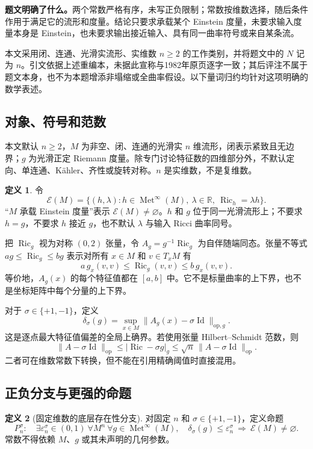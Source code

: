 \documentclass[11pt,a4paper]{article}
\theoremstyle{definition}
\newtheorem{definition}{定义}[section]
\newcommand{\Ric}{\operatorname{Ric}}
\newcommand{\id}{\operatorname{Id}}
\newcommand{\Met}{\operatorname{Met}}
\newcommand{\Ein}{\mathcal E}
\newcommand{\op}{\mathrm{op}}
\begin{document}
\textbf{题文明确了什么。}两个常数严格有序，未写正负限制；常数按维数选择，随后条件作用于满足它的流形和度量。结论只要求承载某个 Einstein 度量，未要求输入度量本身是 Einstein，也未要求输出接近输入、具有同一曲率符号或来自某条流。

本文采用闭、连通、光滑实流形、实维数 $n\ge2$ 的工作类别，并将题文中的 $N$ 记为 $n$。引文依据上述重编本，未据此宣称与1982年原页逐字一致；其后评注不属于题文本身，也不为本题增添非塌缩或全曲率假设。以下量词归约均针对这项明确的数学表述。

\subsection{对象、符号和范数}

本文默认 $n\ge2$，$M$ 为非空、闭、连通的光滑实 $n$ 维流形，闭表示紧致且无边界；$g$ 为光滑正定 Riemann 度量。除专门讨论特征数的四维部分外，不默认定向、单连通、Kähler、齐性或旋转对称。$n$ 是实维数，不是复维数。

\begin{definition}
令
\[
\Ein(M)=\{(h,\lambda):h\in\Met^\infty(M),\ \lambda\in\mathbb R,
\ \Ric_h=\lambda h\}.
\]
“$M$ 承载 Einstein 度量”表示 $\Ein(M)\ne\varnothing$。$h$ 和 $g$ 位于同一光滑流形上；不要求 $h=g$，不要求 $h$ 接近 $g$，也不默认 $\lambda$ 与输入 Ricci 曲率同号。
\end{definition}

把 $\Ric_g$ 视为对称 $(0,2)$ 张量，令 $A_g=g^{-1}\Ric_g$ 为自伴随端同态。张量不等式 $ag\le\Ric_g\le bg$ 表示对所有 $x\in M$ 和 $v\in T_xM$ 有
\[
a\,g_x(v,v)\le\Ric_g(v,v)\le b\,g_x(v,v).
\]
等价地，$A_g(x)$ 的每个特征值都在 $[a,b]$ 中。它不是标量曲率的上下界，也不是坐标矩阵中每个分量的上下界。

对于 $\sigma\in\{+1,-1\}$，定义
\begin{equation}\label{eq:delta}
\delta_\sigma(g)=\sup_{x\in M}\|A_g(x)-\sigma\id\|_{\op,g}.
\end{equation}
这是逐点最大特征值偏差的全局上确界。若使用张量 Hilbert--Schmidt 范数，则
\[
\|A-\sigma\id\|_{\op}\le|\Ric-\sigma g|_g
\le\sqrt n\,\|A-\sigma\id\|_{\op}.
\]
二者可在维数常数下转换，但不能在引用精确阈值时直接混用。

\subsection{正负分支与更强的命题}

\begin{definition}[固定维数的底层存在性分支]\label{def:branch}
对固定 $n$ 和 $\sigma\in\{+1,-1\}$，定义命题
\begin{equation}\label{eq:P}
P_n^\sigma:\quad
\exists\varepsilon_n^\sigma\in(0,1)\ \forall M^n\ \forall g\in\Met^\infty(M),\quad
\delta_\sigma(g)\le\varepsilon_n^\sigma\ \Longrightarrow\ \Ein(M)\ne\varnothing.
\end{equation}
常数不得依赖 $M$、$g$ 或其未声明的几何参数。
\end{definition}
\end{document}
